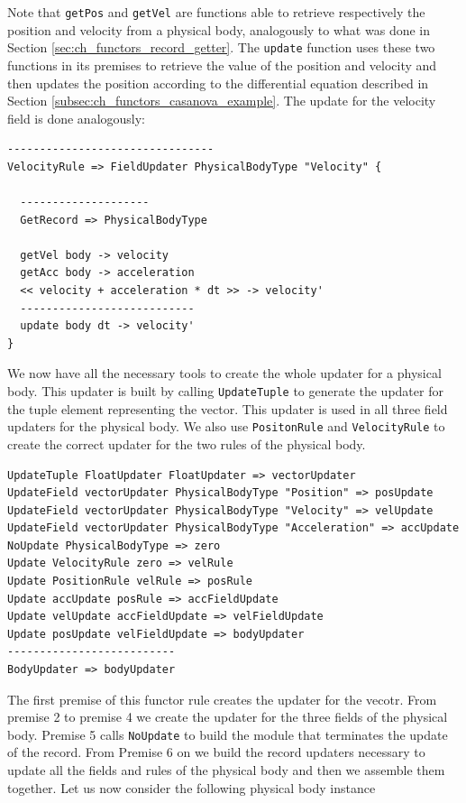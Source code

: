 \noindent
Note that \texttt{getPos} and \texttt{getVel} are functions able to retrieve respectively the position and velocity from a physical body, analogously to what was done in Section \ref{sec:ch_functors_record_getter}. The \texttt{update} function uses these two functions in its premises to retrieve the value of the position and velocity and then updates the position according to the differential equation described in Section \ref{subsec:ch_functors_casanova_example}. The update for the velocity field is done analogously:

\begin{lstlisting}
--------------------------------
VelocityRule => FieldUpdater PhysicalBodyType "Velocity" {

  --------------------
  GetRecord => PhysicalBodyType

  getVel body -> velocity
  getAcc body -> acceleration
  << velocity + acceleration * dt >> -> velocity'
  ---------------------------
  update body dt -> velocity'
}
\end{lstlisting}

\noindent
We now have all the necessary tools to create the whole updater for a physical body. This updater is built by calling \texttt{UpdateTuple} to generate the updater for the tuple element representing the vector. This updater is used in all three field updaters for the physical body. We also use \texttt{PositonRule} and \texttt{VelocityRule} to create the correct updater for the two rules of the physical body.

\begin{lstlisting}
UpdateTuple FloatUpdater FloatUpdater => vectorUpdater
UpdateField vectorUpdater PhysicalBodyType "Position" => posUpdate  
UpdateField vectorUpdater PhysicalBodyType "Velocity" => velUpdate  
UpdateField vectorUpdater PhysicalBodyType "Acceleration" => accUpdate
NoUpdate PhysicalBodyType => zero
Update VelocityRule zero => velRule
Update PositionRule velRule => posRule
Update accUpdate posRule => accFieldUpdate
Update velUpdate accFieldUpdate => velFieldUpdate
Update posUpdate velFieldUpdate => bodyUpdater
--------------------------
BodyUpdater => bodyUpdater
\end{lstlisting}

\noindent
The first premise of this functor rule creates the updater for the vecotr. From premise 2 to premise 4 we create the updater for the three fields of the physical body. Premise 5 calls \texttt{NoUpdate} to build the module that terminates the update of the record. From Premise 6 on we build the record updaters necessary to update all the fields and rules of the physical body and then we assemble them together.
Let us now consider the following physical body instance

